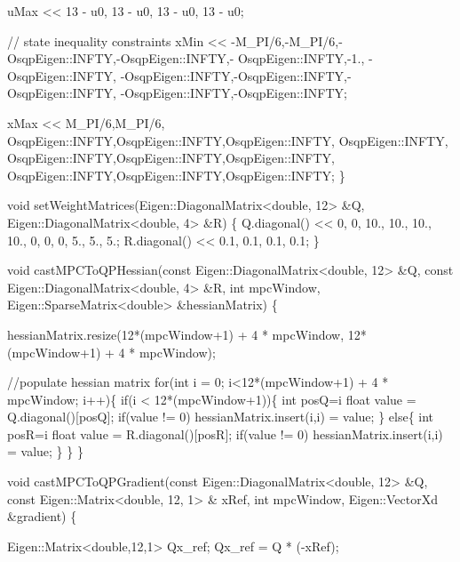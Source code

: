 \begin{DoxyCodeInclude}
    uMax << 13 - u0,
        13 - u0,
        13 - u0,
        13 - u0;

    \textcolor{comment}{// state inequality constraints}
    xMin << -M\_PI/6,-M\_PI/6,-OsqpEigen::INFTY,-OsqpEigen::INFTY,-
      OsqpEigen::INFTY,-1.,
        -OsqpEigen::INFTY, -OsqpEigen::INFTY,-OsqpEigen::INFTY,-OsqpEigen::INFTY,
        -OsqpEigen::INFTY,-OsqpEigen::INFTY;

    xMax << M\_PI/6,M\_PI/6, OsqpEigen::INFTY,OsqpEigen::INFTY,OsqpEigen::INFTY,
        OsqpEigen::INFTY, OsqpEigen::INFTY,OsqpEigen::INFTY,OsqpEigen::INFTY,
        OsqpEigen::INFTY,OsqpEigen::INFTY,OsqpEigen::INFTY;
\}

\textcolor{keywordtype}{void} setWeightMatrices(Eigen::DiagonalMatrix<double, 12> &Q, Eigen::DiagonalMatrix<double, 4> &R)
\{
    Q.diagonal() << 0, 0, 10., 10., 10., 10., 0, 0, 0, 5., 5., 5.;
    R.diagonal() << 0.1, 0.1, 0.1, 0.1;
\}

\textcolor{keywordtype}{void} castMPCToQPHessian(\textcolor{keyword}{const} Eigen::DiagonalMatrix<double, 12> &Q, \textcolor{keyword}{const} Eigen::DiagonalMatrix<double, 4> 
      &R, \textcolor{keywordtype}{int} mpcWindow,
                        Eigen::SparseMatrix<double> &hessianMatrix)
\{

    hessianMatrix.resize(12*(mpcWindow+1) + 4 * mpcWindow, 12*(mpcWindow+1) + 4 * mpcWindow);

    \textcolor{comment}{//populate hessian matrix}
    \textcolor{keywordflow}{for}(\textcolor{keywordtype}{int} i = 0; i<12*(mpcWindow+1) + 4 * mpcWindow; i++)\{
        \textcolor{keywordflow}{if}(i < 12*(mpcWindow+1))\{
            \textcolor{keywordtype}{int} posQ=i%
            \textcolor{keywordtype}{float} value = Q.diagonal()[posQ];
            \textcolor{keywordflow}{if}(value != 0)
                hessianMatrix.insert(i,i) = value;
        \}
        \textcolor{keywordflow}{else}\{
            \textcolor{keywordtype}{int} posR=i%
            \textcolor{keywordtype}{float} value = R.diagonal()[posR];
            \textcolor{keywordflow}{if}(value != 0)
                hessianMatrix.insert(i,i) = value;
        \}
    \}
\}

\textcolor{keywordtype}{void} castMPCToQPGradient(\textcolor{keyword}{const} Eigen::DiagonalMatrix<double, 12> &Q, \textcolor{keyword}{const} Eigen::Matrix<double, 12, 1> &
      xRef, \textcolor{keywordtype}{int} mpcWindow,
                         Eigen::VectorXd &gradient)
\{

    Eigen::Matrix<double,12,1> Qx\_ref;
    Qx\_ref = Q * (-xRef);


\end{DoxyCodeInclude}

